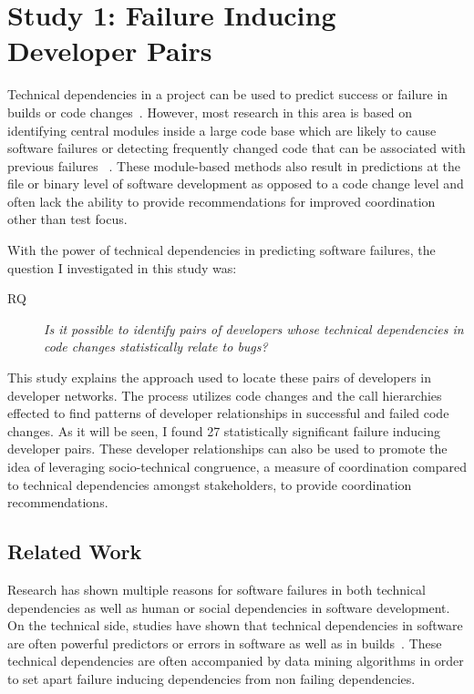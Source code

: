 \section{Study 1: Failure Inducing Developer Pairs}
\label{study:pairs}

Technical dependencies in a project can be used to predict success or failure in
builds or code changes~\cite{Pinzger:2008:DNP, Zimmermann:2008:PDU}. However, most 
research in this area is based on identifying
central modules inside a large code base which are likely to cause software failures or
detecting frequently changed code that can be associated with previous failures
~\cite{Kim:2006:AIB}. 
These module-based methods also result in predictions 
at the file or binary level of software development as opposed to a code change level
and often lack the ability to provide recommendations for improved coordination
other than test focus.

With the power of technical dependencies in predicting software failures, the question I
investigated in this study was:

\begin{description}
        \item[RQ] \textit{Is it possible to identify pairs 
        of developers whose technical dependencies in code changes statistically relate to bugs?}
\end{description}

This study explains the approach used to locate these pairs of developers in developer networks.
The process utilizes code changes and the call hierarchies effected to find patterns of developer 
relationships in successful and failed code changes. As it will be seen, I found 27 statistically
significant failure inducing developer pairs. These developer relationships can also be used
to promote the idea of leveraging socio-technical congruence, a measure of coordination compared
to technical dependencies amongst stakeholders, to provide coordination recommendations.

\subsection{Related Work}

Research has shown multiple reasons for software failures in both technical dependencies as well
as human or social dependencies in software development. On the technical side, studies have shown that
technical dependencies in software are often powerful predictors or errors in software as well as
in builds~\cite{Pinzger:2008:DNP, Zimmermann:2008:PDU, Hassan:4019574}. These technical dependencies
are often accompanied by data mining algorithms in order to set apart failure inducing dependencies
from non failing dependencies.

